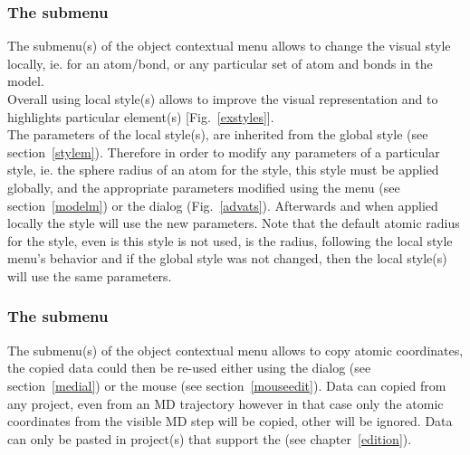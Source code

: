 \subsubsection{The  submenu}
\label{mstyle}

The  submenu(s) of the object contextual menu allows to change the visual style locally, ie. for an atom/bond, or any particular set of atom and bonds in the model. \\
\laf Overall using local style(s) allows to improve the visual representation and to highlights particular element(s) [Fig.~\ref{exstyles}]. \\
\newpage
\noindent The parameters of the local style(s), are inherited from the global style (see section~\ref{stylem}). 
Therefore in order to modify any parameters of a particular style, ie. the sphere radius of an atom for the  style, 
this style must be applied globally, and the appropriate parameters modified using the  menu (see section~\ref{modelm}) or the  dialog (Fig.~\ref{advats}). 
Afterwards and when applied locally the  style will use the new parameters. 
Note that the default atomic radius for the  style, even is this style is not used, is the  radius, 
following the local style menu's behavior and if the global  style was not changed, 
then the local  style(s) will use the same parameters. 

\subsubsection{The  submenu}

The  submenu(s) of the object contextual menu allows to copy atomic coordinates, the copied data could then be re-used either using the  dialog (see section~\ref{medial}) or the mouse  (see section~\ref{mouseedit}).
\laf Data can copied from any project, even from an MD trajectory however in that case only the atomic coordinates from the visible MD step will be copied, other will be ignored. 
Data can only be pasted in project(s) that support the  (see chapter~\ref{edition}).

